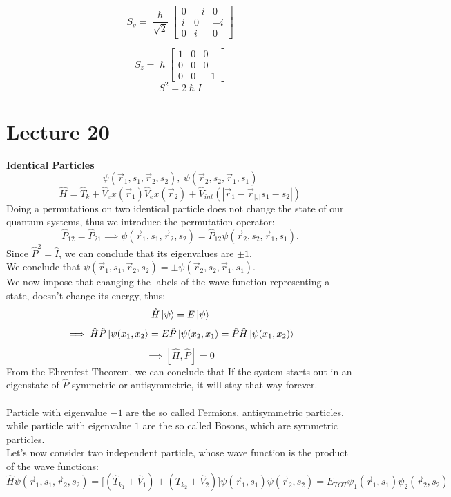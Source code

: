 \documentclass{article}
\begin{document}
$$
S_y = \frac{\hslash}{\sqrt{2}} \begin{bmatrix}
0 & -i & 0 \\
i & 0 & -i \\
0 & i & 0
\end{bmatrix}
$$

$$
S_z = \hslash \begin{bmatrix}
1 & 0 & 0 \\
0 & 0 & 0 \\
0 & 0 & -1
\end{bmatrix}
$$
$$S^2 = 2\hslash I$$

\section{Lecture 20}
\textbf{Identical Particles}
$$\psi(\Vec{r}_1, s_1,\Vec{r}_2,s_2),\ \psi(\Vec{r}_2,s_2,\Vec{r}_1,s_1)$$
$$\hat{H} = \hat{T}_k+ \hat{V}_ex(\Vec{r}_1) \hat{V}_ex(\Vec{r}_2)+ \hat{V}_{int}(|\Vec{r}_1-\Vec{r}_|,|s_1-s_2|)$$
Doing a permutations on two identical particle does not change the state of our quantum systems, thus we introduce the permutation operator:
$$\hat{P}_{12} = \hat{P}_{21} \implies \psi(\Vec{r}_1,s_1,\Vec{r}_2,s_2) = \hat{P}_{12}\psi(\Vec{r}_2,s_2,\vec{r}_1,s_1).$$
Since $\hat{P}^2 = \hat{I} $, we can conclude that its eigenvalues are $\pm 1.$ \\
We conclude that $\psi(\vec{r}_1,s_1,\vec{r}_2,s_2) = \pm \psi(\vec{r}_2,s_2,\vec{r}_1,s_1)$. \\
We now impose that changing the labels of the wave function representing a state, doesn't change its energy, thus:
$$\hat{H}\ket{\psi} = E\ket{\psi}$$
$$\implies \hat{H}\hat{P}\ket{\psi(x_1,x_2} = E\hat{P}\ket{\psi(x_2,x_1} = \hat{P}\hat{H}\ket{\psi(x_1,x_2)}$$
$$\implies [\hat{H},\hat{P}] = 0$$
From the Ehrenfest Theorem, we can conclude that If the system starts out in an eigenstate of $\hat{P}$ symmetric or antisymmetric, it will stay that way forever. \\ \\
Particle with eigenvalue $-1$ are the so called Fermions, antisymmetric particles, while particle with eigenvalue $1$ are the so called Bosons, which are symmetric particles.\\
Let's now consider two independent particle, whose wave function is the product of the wave functions:
$$\hat{H} \psi(\vec{r}_1,s_1,\vec{r}_2,s_2) = \bigl[ (\hat{T}_{k_1}+ \hat{V}_1) +(\hat{T}_{k_2}+ \hat{V}_2) \bigl] \psi(\vec{r}_1,s_1) \psi(\vec{r}_2,s_2) = E_{TOT}\psi_1(\vec{r}_1,s_1)\psi_2(\vec{r}_2,s_2) $$
\end{document}
